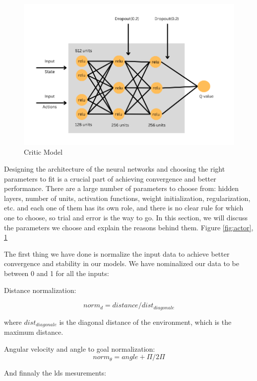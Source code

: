 \documentclass[12pt]{extarticle}
\begin{document}
\begin{figure}[H]  
\centering
\includegraphics[scale=0.55]{critic_net}
\caption[Critic model]{Critic Model}
\label{fig:critic}
\end{figure}
Designing the architecture of the neural networks and choosing the right parameters to fit is a crucial part of achieving convergence and better performance. There are a large number of parameters to choose from: hidden layers, number of units, activation functions, weight initialization, regularization, etc. and each one of them has its own role, and there is no clear rule for which one to choose, so trial and error is the way to go. In this section, we will discuss the parameters we choose and explain the reasons behind them. Figure \ref{fig:actor}, \ref{fig:critic}
 
The first thing we have done is normalize the input data to achieve better convergence and stability in our models. We have nominalized our data to be between 0 and 1 for all the inputs:

Distance normalization:

  \begin{equation} \label{dist_norm}
     norm_d=distance/dist_{diagonale} 
   \end{equation}
   
where $dist_{diagonale}$ is the diagonal distance of the environment, which is the maximum distance.

Angular velocity and angle to goal normalization:
\begin{equation} \label{angle_norm}
     norm_\theta=angle+\Pi/2\Pi
   \end{equation}

And finnaly the lds mesurements:
\end{document}
